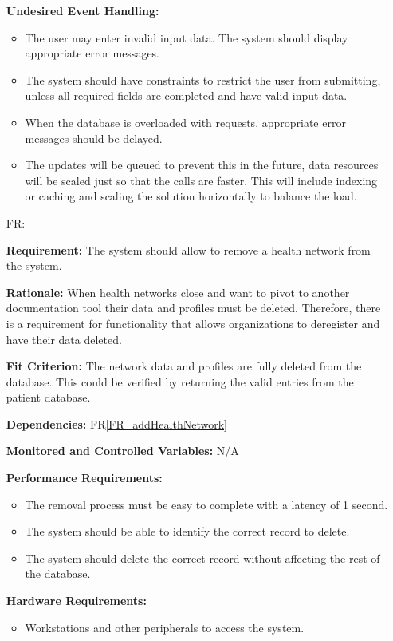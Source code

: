 \documentclass[12pt]{article}
\newcounter{reqnum} %
\begin{document}
\begin{itemize}
\textbf{Undesired Event Handling:} 
\begin{itemize}
  \item The user may enter invalid input data. The system should display appropriate error messages. 
  \item The system should have constraints to restrict the user from submitting, unless all required fields are completed and have valid input data. 
  \item When the database is overloaded with requests, appropriate error messages should be delayed. 
  \item The updates will be queued to prevent this in the future, data resources will be scaled just so that the calls are faster. This will include indexing or caching and scaling the solution horizontally to balance the load.
\end{itemize}


\item[FR\refstepcounter{reqnum}\thereqnum \label{FR_removeHealthNetwork}:]  

\textbf{Requirement:} The system should allow to remove a health network from the system.

\textbf{Rationale:} 
When health networks close and want to pivot to another documentation tool their data and profiles must be deleted. Therefore, there is a requirement for functionality that allows organizations to deregister and have their data deleted.

\textbf{Fit Criterion:} 
The network data and profiles are fully deleted from the database. This could be verified by returning the valid entries from the patient database.

\textbf{Dependencies:} FR\ref{FR_addHealthNetwork} 

\textbf{Monitored and Controlled Variables:} N/A

\textbf{Performance Requirements:} 
\begin{itemize}
  \item The removal process must be easy to complete with a latency of 1 second. 
  \item The system should be able to identify the correct record to delete. 
  \item The system should delete the correct record without affecting the rest of the database. 
\end{itemize}

\textbf{Hardware Requirements:} 
\begin{itemize}
  \item Workstations and other peripherals to access the system.
\end{itemize}


\end{itemize}
\end{document}
